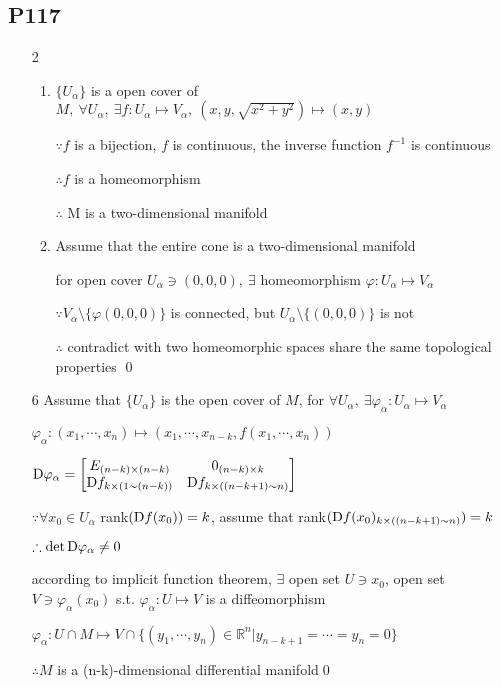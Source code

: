 \subsection{P117}
\begin{enumerate}[1]
    \item[2] 
    \begin{enumerate}[(1)]
        \item 
        $\{U_{\alpha}\}$ is a open cover of $M,\ \forall U_{\alpha},\ \exists f:U_{\alpha} \mapsto V_{\alpha},\ (x,y,\sqrt{x^2+y^2}) \mapsto (x,y) $
        \par $\because f$ is a bijection, $f$ is continuous, the inverse function $f^{-1}$ is continuous
        \par $ \therefore f $ is a homeomorphism
        \par $\therefore $ M is a  two-dimensional manifold

        \item 
        Assume that the entire cone is a two-dimensional manifold
        \par for open cover $U_{\alpha}\ni (0,0,0),\ \exists $ homeomorphism $ \varphi  : U_{\alpha} \mapsto V_{\alpha} $
        \par $ \because V_{\alpha} \setminus \{\varphi(0,0,0)\} $ is connected, but $U_{\alpha} \setminus \{(0,0,0)\}$ is not 
        \par $\therefore  $ contradict with two homeomorphic spaces share the same topological properties \qed
    \end{enumerate}

    \item[6]
    Assume that $\{U_{\alpha}\}$ is the open cover of $M$, for $\forall U_{\alpha},\ \exists \varphi_{\alpha}: U_{\alpha}\mapsto V_{\alpha}$
    \par $\varphi_{\alpha}:(x_1,\cdots,x_n) \mapsto (x_1,\cdots,x_{n-k},f(x_1,\cdots,x_n)) $
    \par $ \Dif \varphi_{\alpha} = \begin{bmatrix} E_{(n-k)\times (n-k)} & 0_{(n-k)\times k} \\\Dif f_{k\times (1\sim (n-k))} &\Dif f_{k\times ((n-k+1)\sim n )} \end{bmatrix}$
    \par $\because \forall x_0 \in U_{\alpha} $ rank$(\Dif f(x_0) )= k $, assume that rank$(\Dif f(x_0)_{k\times ((n-k+1)\sim n )} )= k $
    \par $\therefore \det \Dif \varphi_{\alpha} \not= 0 $
    \par according to implicit function theorem, $ \exists $ open set $ U \ni x_0 $, open set $ V \ni \varphi_{\alpha}(x_0)$ s.t. $ \varphi_{\alpha}: U \mapsto V$ is a diffeomorphism
    \par $ \varphi_{\alpha}: U\cap M \mapsto V \cap \{(y_1,\cdots,y_n)\in \mathbb{R}^n | y_{n-k+1} = \cdots = y_n=0 \}$
    \par $ \therefore M$ is a (n-k)-dimensional differential manifold\qed
\end{enumerate}


